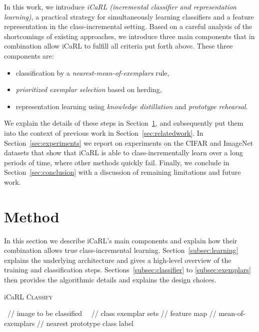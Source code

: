 \documentclass[10pt,twocolumn,letterpaper]{article}
\begin{document}
In this work, we introduce \emph{iCaRL (incremental classifier and 
representation learning)}, a practical strategy for simultaneously 
learning classifiers and a feature representation in the 
class-incremental setting.
Based on a careful analysis of the shortcomings of existing approaches, 
we introduce three main components that in combination allow iCaRL to 
fulfill all criteria put forth above. 
These three components are:
\begin{itemize}[itemsep=0pt,topsep=2pt]
\item classification by a \emph{nearest-mean-of-exemplars} rule,
\item \emph{prioritized exemplar selection} based on herding, 
\item representation learning using \emph{knowledge distillation}
and \emph{prototype rehearsal}.
\end{itemize}
We explain the details of these steps in Section~\ref{sec:method},
and subsequently put them into the context of previous work in 
Section~\ref{sec:relatedwork}. 
In Section~\ref{sec:experiments} we report on experiments on 
the CIFAR and ImageNet datasets that show that iCaRL is able 
to class-incrementally learn over a long periods of time, 
where other methods quickly fail.
Finally, we conclude in Section~\ref{sec:conclusion} with a discussion 
of remaining limitations and future work.

\renewcommand{\phi}{\varphi}
\section{Method}\label{sec:method}
In this section we describe iCaRL's main components 
and explain how their combination allows true 
class-incremental learning. 
Section~\ref{subsec:learning} explains the underlying 
architecture and gives a high-level overview of 
the training and classification steps.
Sections~\ref{subsec:classifier} to \ref{subsec:exemplars} 
then provides the algorithmic details and explains
the design choices. 

\begin{algorithm}[t]
\caption{iCaRL \textsc{Classify}}\label{alg:icarl-classify}
    \begin{algorithmic}
        \INPUT  \qquad\qquad\qquad\qquad\quad \  // image to be classified
        \REQUIRE  \quad\ \  // class exemplar sets 
        \REQUIRE  \qquad\qquad // feature map 
        \FOR{}
        \STATE  \qquad // mean-of-exemplars \ENDFOR
        \STATE  \quad // nearest prototype
        \OUTPUT class label  
    \end{algorithmic}
\end{algorithm}
\end{document}
